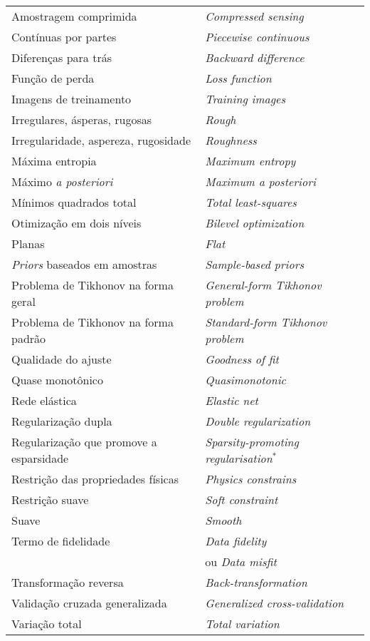 \begin{table}[H]
\begin{center}
\begin{tabular}{ l l }
Amostragem comprimida & \textit{Compressed sensing} \\
Contínuas por partes & \textit{Piecewise continuous} \\
Diferenças para trás & \textit{Backward difference} \\
Função de perda & \textit{Loss function} \\
Imagens de treinamento & \textit{Training images} \\
Irregulares, ásperas, rugosas & \textit{Rough} \\
Irregularidade, aspereza, rugosidade & \textit{Roughness} \\
Máxima entropia & \textit{Maximum entropy} \\
Máximo \textit{a posteriori} & \textit{Maximum a posteriori} \\
Mínimos quadrados total & \textit{Total least-squares} \\
Otimização em dois níveis & \textit{Bilevel optimization} \\
Planas & \textit{Flat} \\
\textit{Priors} baseados em amostras & \textit{Sample-based priors} \\
Problema de Tikhonov na forma geral & \textit{General-form Tikhonov problem} \\
Problema de Tikhonov na forma padrão & \textit{Standard-form Tikhonov problem} \\
Qualidade do ajuste & \textit{Goodness of fit} \\
Quase monotônico & \textit{Quasimonotonic} \\
Rede elástica & \textit{Elastic net}\\
Regularização dupla & \textit{Double regularization} \\
Regularização que promove a esparsidade & \textit{Sparsity-promoting regularisation}$^*$\\
Restrição das propriedades físicas & \textit{Physics constrains} \\
Restrição suave & \textit{Soft constraint} \\
Suave & \textit{Smooth} \\
Termo de fidelidade & \textit{Data fidelity}  \\
 & \quad ou \textit{Data misfit} \\
Transformação reversa & \textit{Back-transformation} \\
Validação cruzada generalizada & \textit{Generalized cross-validation} \\
Variação total & \textit{Total variation} \\
\end{tabular}
\end{center}
\end{table}

